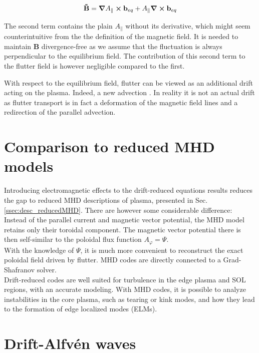 \begin{equation}
	\mathbf{\tilde{B}} = \grad A_\parallel\cross\mathbf{b}_{eq} + A_\parallel \grad\cross \mathbf{b}_{eq}
\end{equation}

The second term contains the plain $A_\parallel$ without its derivative, which might seem counterintuitive from the the definition of the magnetic field. It is needed to maintain $\mathbf{B}$ divergence-free as we assume that the fluctuation is always perpendicular to the equilibrium field. The contribution of this second term to the flutter field is however negligible compared to the first.

With respect to the equilibrium field, flutter can be viewed as an additional drift acting on the plasma. Indeed, a new advection . In reality it is not an actual drift as flutter transport is in fact a deformation of the magnetic field lines and a redirection of the parallel advection. 


\section{Comparison to reduced MHD models}
\label{sec:edge_comparisonMHD}

Introducing electromagnetic effects to the drift-reduced equations results reduces the gap to reduced MHD descriptions of plasma, presented in Sec. \ref{ssec:desc_reducedMHD}. There are however some considerable difference: 
Instead of the parallel current and magnetic vector potential, the MHD model retains only their toroidal component. The magnetic vector potential there is then self-similar to the poloidal flux function $A_\varphi = \Psi$. \\

With the knowledge of $\Psi$, it is much more convenient to reconstruct the exact poloidal field driven by flutter. MHD codes are directly connected to a Grad-Shafranov solver. \\

Drift-reduced codes are well suited for turbulence in the edge plasma and SOL regions, with an accurate modeling. With MHD codes, it is possible to analyze instabilities in the core plasma, such as tearing or kink modes, and how they lead to the formation of edge localized modes (ELMs). 



\section{Drift-Alfvén waves}
\label{sec:edge_DAW}

